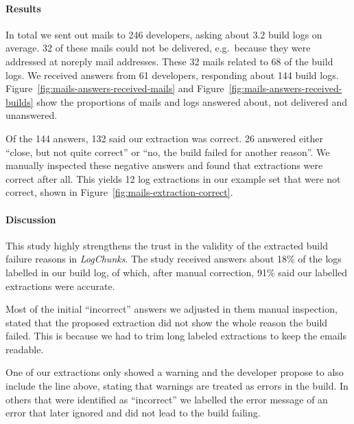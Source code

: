 \documentclass[\myrootdir/main.tex]{subfiles}
\begin{document}
\paragraph{Results}
In total we sent out mails to 246 developers, asking about 3.2 build logs on average.
32 of these mails could not be delivered, e.g.\ because they were addressed at noreply mail addresses.
These 32 mails related to 68 of the build logs.
We received answers from 61 developers, responding about 144 build logs.
Figure~\ref{fig:mails-answers-received-mails} and Figure~\ref{fig:mails-answers-received-builds} show the proportions of mails and logs answered about, not delivered and unanswered.

Of the 144 answers, 132 said our extraction was correct.
26 answered either ``close, but not quite correct'' or ``no, the build failed for another reason''.
We manually inspected these negative answers and found that extractions were correct after all.
This yields 12 log extractions in our example set that were not correct, shown in Figure~\ref{fig:mails-extraction-correct}.

\paragraph{Discussion}
This study highly strengthens the trust in the validity of the extracted build failure reasons in \emph{LogChunks}.
The study received answers about 18\% of the logs labelled in our build log, of which, after manual correction, 91\% said our labelled extractions were accurate.

Most of the initial ``incorrect'' answers we adjusted in them manual inspection, stated that the proposed extraction did not show the whole reason the build failed.
This is because we had to trim long labeled extractions to keep the emails readable.

One of our extractions only showed a warning and the developer propose to also include the line above, stating that warnings are treated as errors in the build.
In others that were identified as ``incorrect'' we labelled the error message of an error that later ignored and did not lead to the build failing.
\end{document}
